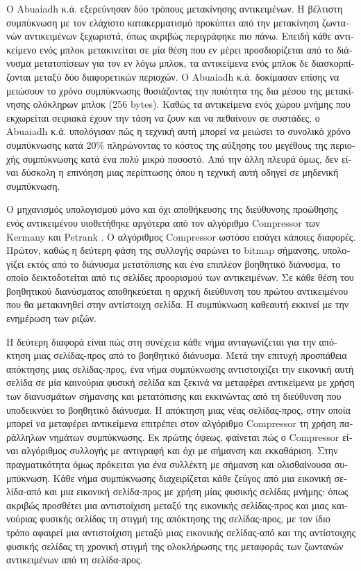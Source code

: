 \begin{greek}
Ο Abuaiadh κ.ά. εξερεύνησαν δύο τρόπους μετακίνησης αντικειμένων.
Η βέλτιστη συμπύκνωση με τον ελάχιστο κατακερματισμό προκύπτει
από την μετακίνηση ζωντανών αντικειμένων ξεχωριστά, όπως ακριβώς
περιγράφηκε πιο πάνω. Επειδή κάθε αντικείμενο ενός μπλοκ μετακινείται
σε μία θέση που εν μέρει προσδιορίζεται από το διάνυσμα μετατοπίσεων
για τον εν λόγω μπλοκ, τα αντικείμενα ενός μπλοκ δε διασκορπίζονται
μεταξύ δύο διαφορετικών περιοχών. Ο Abuaiadh κ.ά. δοκίμασαν επίσης
να μειώσουν το χρόνο συμπύκνωσης θυσιάζοντας την ποιότητα της δια
μέσου της μετακίνησης ολόκληρων μπλοκ (256 bytes). Καθώς τα αντικείμενα
ενός χώρου μνήμης που εκχωρείται σειριακά έχουν την τάση να ζουν
και να πεθαίνουν σε συστάδες, ο Abuaiadh κ.ά. υπολόγισαν πώς
η τεχνική αυτή μπορεί να μειώσει το συνολικό χρόνο συμπύκνωσης
κατά 20\% πληρώνοντας το κόστος της αύξησης του μεγέθους της
περιοχής συμπύκνωσης κατά ένα πολύ μικρό ποσοστό. Από την άλλη
πλευρά όμως, δεν είναι δύσκολη η επινόηση μιας περίπτωσης όπου
η τεχνική αυτή οδηγεί σε μηδενική συμπύκνωση.

Ο μηχανισμός υπολογισμού μόνο και όχι αποθήκευσης της διεύθυνσης
προώθησης ενός αντικειμένου υιοθετήθηκε αργότερα από τον αλγόριθμο
Compressor των Kermany και Petrank \cite{DBLP:conf/pldi/KermanyP06}.
Ο αλγόριθμος Compressor ωστόσο εισάγει κάποιες διαφορές. Πρώτον,
καθώς η δεύτερη φάση της συλλογής σαρώνει το bitmap σήμανσης,
υπολογίζει εκτός από το διάνυσμα μετατόπισης και ένα επιπλέον
βοηθητικό διάνυσμα, το οποίο δεικτοδοτείται από τις σελίδες προορισμού
των αντικειμένων. Σε κάθε θέση του βοηθητικού διανύσματος αποθηκεύεται
η αρχική διεύθυνση του πρώτου αντικειμένου που θα μετακινηθεί
στην αντίστοιχη σελίδα. Η συμπύκνωση καθεαυτή εκκινεί με την
ενημέρωση των ριζών.

Η δεύτερη διαφορά είναι πώς στη συνέχεια κάθε νήμα ανταγωνίζεται
για την απόκτηση μιας σελίδας-προς από το βοηθητικό διάνυσμα.
Μετά την επιτυχή προσπάθεια απόκτησης μιας σελίδας-προς, ένα
νήμα συμπύκνωσης αντιστοιχίζει την εικονική αυτή σελίδα σε μία
καινούρια φυσική σελίδα και ξεκινά να μεταφέρει αντικείμενα
με χρήση των διανυσμάτων σήμανσης και μετατόπισης και εκκινώντας
από τη διεύθυνση που υποδεικνύει το βοηθητικό διάνυσμα. Η απόκτηση
μιας νέας σελίδας-προς, στην οποία μπορεί να μεταφέρει αντικείμενα
επιτρέπει στον αλγόριθμο Compressor τη χρήση παράλληλων νημάτων
συμπύκνωσης. Εκ πρώτης όψεως, φαίνεται πώς ο Compressor είναι
αλγόριθμος συλλογής με αντιγραφή και όχι με σήμανση και εκκαθάριση.
Στην πραγματικότητα όμως πρόκειται για ένα συλλέκτη με σήμανση
και ολισθαίνουσα συμπύκνωση. Κάθε νήμα συμπύκνωσης διαχειρίζεται
κάθε ζεύγος από μια εικονική σελίδα-από και μια εικονική σελίδα-προς
με χρήση μίας φυσικής σελίδας μνήμης: όπως ακριβώς προσθέτει
μια αντιστοίχιση μεταξύ της εικονικής σελίδας-προς και μιας
καινούριας φυσικής σελίδας τη στιγμή της απόκτησης της σελίδας-προς,
με τον ίδιο τρόπο αφαιρεί μια αντιστοίχιση μεταξύ μιας εικονικής
σελίδας-από και της αντίστοιχης φυσικής σελίδας τη χρονική στιγμή
της ολοκλήρωσης της μεταφοράς των ζωντανών αντικειμένων από τη
σελίδα-προς.
 

\end{greek}
